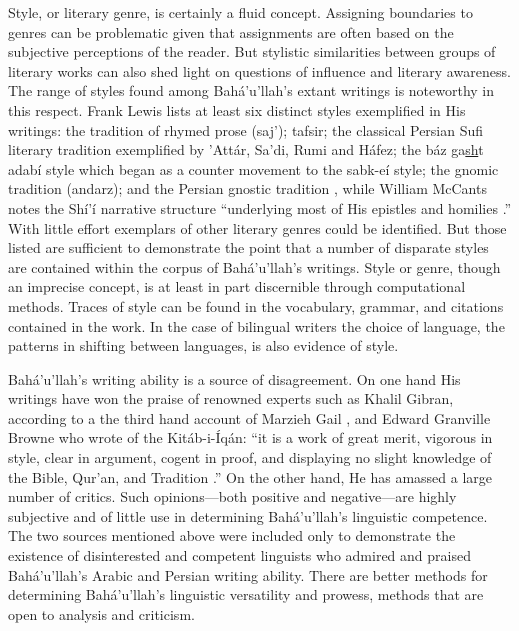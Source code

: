\documentclass[12pt, oneside]{report}
\begin{document}
\par
Style, or literary genre, is certainly a fluid concept.
Assigning boundaries to genres can be problematic given that assignments are often based on the subjective perceptions of the reader.
But stylistic similarities between groups of literary works can also shed light on questions of influence and literary awareness.
The range of styles found among Bah\'{a}'u'llah's extant writings is noteworthy in this respect.
Frank Lewis lists at least six distinct styles exemplified in His writings: the tradition of rhymed prose (saj'); tafsir; the classical Persian Sufi literary tradition exemplified by 'Att\'{a}r, Sa'di, Rumi and H\'{a}fez; the b\'{a}z ga\underline{sh}t adab\'{i} style which began as a counter movement to the sabk-e\'{i} style; the gnomic tradition (andarz); and the Persian gnostic tradition \cite{lewis_frank_scripture_1997}, while William McCants notes the Sh\'{i}'\'{i} narrative structure ``underlying most of His epistles and homilies \cite{mccants_wronged_2002}.''
With little effort exemplars of other literary genres could be identified.
But those listed are sufficient to demonstrate the point that a number of disparate styles are contained within the corpus of Bah\'{a}'u'llah's writings.
Style or genre, though an imprecise concept, is at least in part discernible through computational methods.
Traces of style can be found in the vocabulary, grammar, and citations contained in the work.
In the case of bilingual writers the choice of language, the patterns in shifting between languages, is also evidence of style.
\par
Bah\'{a}'u'llah's writing ability is a source of disagreement.
On one hand His writings have won the praise of renowned experts such as Khalil Gibran, according to a the third hand account of Marzieh Gail \cite{gail_world_1978}, and Edward Granville Browne who wrote of the Kit\'{a}b-i-\'{I}q\'{a}n: ``it is a work of great merit, vigorous in style, clear in argument, cogent in proof, and displaying no slight knowledge of the Bible, Qur'an, and Tradition \cite{momen_selections_1987}.''
On the other hand, He has amassed a large number of critics.
Such opinions---both positive and negative---are highly subjective and of little use in determining Bah\'{a}'u'llah's linguistic competence.
The two sources mentioned above were included only to demonstrate the existence of disinterested and competent linguists who admired and praised Bah\'{a}'u'llah's Arabic and Persian writing ability.
There are better methods for determining Bah\'{a}'u'llah's linguistic versatility and prowess, methods that are open to analysis and criticism.
\end{document}
